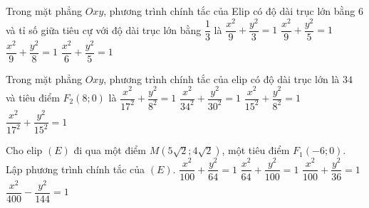\begin{ex}%
	Trong mặt phẳng $Oxy$, phương trình chính tắc của Elip có độ dài trục lớn bằng $6$ và tỉ số giữa tiêu cự với độ dài trục lớn bằng $\dfrac{1}{3}$  là
	 \choice
		{$\dfrac{x^2}{9}+\dfrac{y^2}{3}=1$} 
		{$\dfrac{x^2}{9}+\dfrac{y^2}{5}=1$} 
		{\True  $\dfrac{x^2}{9}+\dfrac{y^2}{8}=1$}
		{$\dfrac{x^2}{6}+\dfrac{y^2}{5}=1$} 
\end{ex}

\begin{ex}%
	Trong mặt phẳng $Oxy$,  phương trình chính tắc của elip có độ dài trục lớn là $34$ và tiêu điểm $F_2(8;0)$ là
	 \choice
		{$\dfrac{x^2}{17^2}+\dfrac{y^2}{8^2}=1$} 
		{$\dfrac{x^2}{34^2}+\dfrac{y^2}{30^2}=1$} 
		 {$\dfrac{x^2}{15^2}+\dfrac{y^2}{8^2}=1$}
		{\True $\dfrac{x^2}{17^2}+\dfrac{y^2}{15^2}=1$} 
\end{ex}

\begin{ex}%
	Cho elip $(E)$ đi qua một điểm $M\left(5\sqrt{2};4\sqrt{2}\right)$,  một tiêu điểm $F_1(-6;0)$. Lập phương trình chính tắc của $(E)$.
	\choice 
		{  \True $\dfrac{x^2}{100}+\dfrac{y^2}{64}=1$}
		 {$\dfrac{x^2}{64}+\dfrac{y^2}{100}=1$}
		{ $\dfrac{x^2}{100}+\dfrac{y^2}{36}=1$} 
		{$\dfrac{x^2}{400}-\dfrac{y^2}{144}=1$} 
\end{ex}


